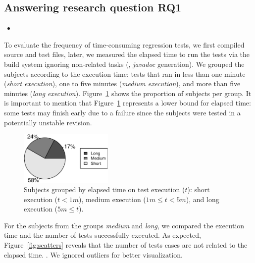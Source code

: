 \subsection{Answering research question RQ1}
\label{sec:rqone}

\begin{itemize}
    \item \RQA
\end{itemize}

To evaluate the frequency of time-consuming regression tests, we first
compiled source and test files, later, we measured the elapsed time to
run the tests via the build system ignoring non-related tasks (\eg,
\emph{javadoc} generation).  We grouped the subjects according to the
execution time: tests that ran in less than one minute (\emph{short
execution}), one to five minutes (\emph{medium execution}), and more
than five minutes (\emph{long execution}).
Figure~\ref{fig:piechart-time} shows the proportion of subjects per
group. It is important to mention that Figure~\ref{fig:piechart-time}
represents a lower bound for elapsed time: some tests may finish early
due to a failure since the subjects were tested in a potentially
unstable revision.

\begin{figure}[h!]
    \centering
    \includegraphics[width=0.4\textwidth]{results/rq1/plots/piechart.pdf}
    \caption{\label{fig:piechart-time} Subjects grouped by elapsed
    time on test execution ($t$): short execution ($t < 1m$), medium 
    execution ($1m \leq t < 5m$), and long execution ($5m \leq t$).}
\end{figure}

For the subjects from the groups \emph{medium} and \emph{long}, we
compared the execution time and the number of tests successfully
executed. As expected, Figure~\ref{fig:scatters} reveals that the
number of tests cases are not related to the elapsed time.
.
We ignored outliers for better visualization.

